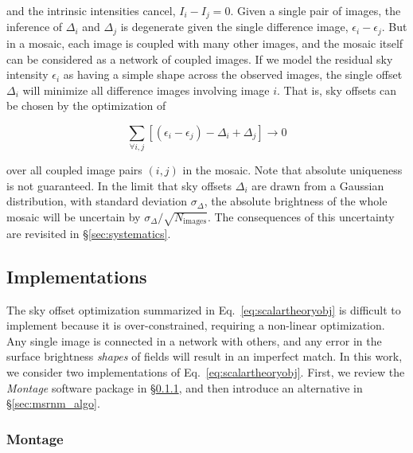\documentclass[iop]{emulateapj}
\newcommand{\sw}[1]{\textit{#1}} %
\newcommand{\Eq}[1]{Eq.~\ref{eq:#1}}  %
\newcommand{\Sec}[1]{\S\ref{sec:#1}}  %
\begin{document}
\noindent and the intrinsic intensities cancel, $I_i - I_j = 0$.
Given a single pair of images, the inference of $\Delta_i$ and $\Delta_j$ is degenerate given the single difference image, $\epsilon_i-\epsilon_j$.
But in a mosaic, each image is coupled with many other images, and the mosaic itself can be considered as a network of coupled images.
If we model the residual sky intensity $\epsilon_i$ as having a simple shape across the observed images, the single offset $\Delta_i$ will minimize all difference images involving image $i$.
That is, sky offsets can be chosen by the optimization of

\begin{equation}
    \sum_{\forall i,j} [(\epsilon_i - \epsilon_j) - \Delta_i + \Delta_j] \rightarrow 0
    \label{eq:scalartheoryobj}
\end{equation}

\noindent over all coupled image pairs $(i,j)$ in the mosaic.
Note that absolute uniqueness is not guaranteed.
In the limit that sky offsets $\Delta_i$ are drawn from a Gaussian distribution, with standard deviation $\sigma_\Delta$, the absolute brightness of the whole mosaic will be uncertain by $\sigma_\Delta / \sqrt{N_\mathrm{images}}$.
The consequences of this uncertainty are revisited in \Sec{systematics}.

\subsection{Implementations}
\label{sec:offset_algos}

The sky offset optimization summarized in \Eq{scalartheoryobj} is difficult to implement because it is over-constrained, requiring a non-linear optimization.
Any single image is connected in a network with others, and any error in the surface brightness \emph{shapes} of fields will result in an imperfect match.
In this work, we consider two implementations of \Eq{scalartheoryobj}.
First, we review the \sw{Montage} software package in \Sec{montage_algo}, and then introduce an alternative in \Sec{msrnm_algo}.

\subsubsection{Montage}
\label{sec:montage_algo}
\end{document}
